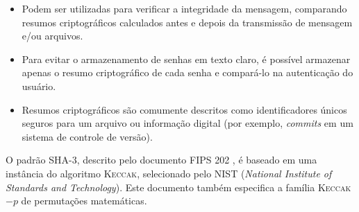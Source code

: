 \documentclass{article}
\begin{document}
\begin{itemize}
\begin{itemize}

\item Podem ser utilizadas para verificar a integridade da mensagem, comparando
resumos criptográficos calculados antes e depois da transmissão de mensagem e/ou 
arquivos.

\item Para evitar o armazenamento de senhas em texto claro, é possível
armazenar apenas o resumo criptográfico de cada senha e compará-lo na
autenticação do usuário.

\item Resumos criptográficos são comumente descritos como identificadores únicos
seguros para um arquivo ou informação digital (por exemplo, \emph{commits} em um
sistema de controle de versão).

\end{itemize}

O padrão SHA-3, descrito pelo documento FIPS 202 \cite{Dworkin2015},
é baseado em uma instância do algoritmo \textsc{Keccak}, selecionado
pelo NIST (\emph{National Institute of Standards and Technology}).
Este documento também especifica a família \textsc{Keccak}$-p$ de
permutações matemáticas.

\end{itemize}



\end{document}
